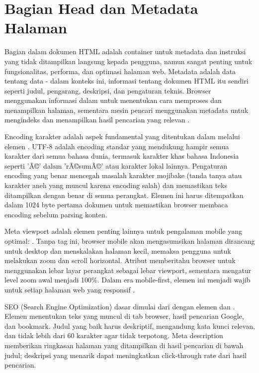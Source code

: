 ﻿\section{Bagian Head dan Metadata Halaman}

Bagian  dalam dokumen HTML adalah container untuk metadata dan instruksi yang tidak ditampilkan langsung kepada pengguna, namun sangat penting untuk fungsionalitas, performa, dan optimasi halaman web. Metadata adalah data tentang data - dalam konteks ini, informasi tentang dokumen HTML itu sendiri seperti judul, pengarang, deskripsi, dan pengaturan teknis. Browser menggunakan informasi dalam  untuk menentukan cara memproses dan menampilkan halaman, sementara mesin pencari menggunakan metadata untuk mengindeks dan menampilkan hasil pencarian yang relevan \cite{mdnHtmlIntro}.

Encoding karakter adalah aspek fundamental yang ditentukan dalam  melalui elemen . UTF-8 adalah encoding standar yang mendukung hampir semua karakter dari semua bahasa dunia, termasuk karakter khas bahasa Indonesia seperti 'Ã©' dalam 'rÃ©sumÃ©' atau karakter lokal lainnya. Pengaturan encoding yang benar mencegah masalah karakter mojibake (tanda tanya atau karakter aneh yang muncul karena encoding salah) dan memastikan teks ditampilkan dengan benar di semua perangkat. Elemen  ini harus ditempatkan dalam 1024 byte pertama dokumen untuk memastikan browser membaca encoding sebelum parsing konten.

\begin{sloppypar}
Meta viewport adalah elemen penting lainnya untuk pengalaman mobile yang optimal: . Tanpa tag ini, browser mobile akan mengasumsikan halaman dirancang untuk desktop dan menskalakan halaman kecil, memaksa pengguna untuk melakukan zoom dan scroll horizontal. Atribut  memberitahu browser untuk menggunakan lebar layar perangkat sebagai lebar viewport, sementara  mengatur level zoom awal menjadi 100\%. Dalam era mobile-first, elemen ini menjadi wajib untuk setiap halaman web yang responsif \cite{webdevHtml}.
\end{sloppypar}

SEO (Search Engine Optimization) dasar dimulai dari  dengan elemen  dan . Elemen  menentukan teks yang muncul di tab browser, hasil pencarian Google, dan bookmark. Judul yang baik harus deskriptif, mengandung kata kunci relevan, dan tidak lebih dari 60 karakter agar tidak terpotong. Meta description memberikan ringkasan halaman yang ditampilkan di hasil pencarian di bawah judul; deskripsi yang menarik dapat meningkatkan click-through rate dari hasil pencarian.

